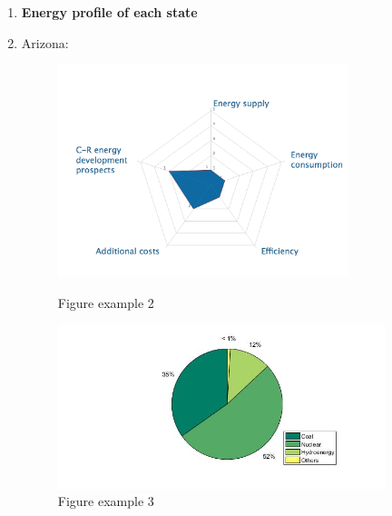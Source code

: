 \documentclass{mcmthesis}
\begin{document}
        \begin{enumerate}
          \item \textbf{Energy profile of each state}

          \item Arizona:
          
          
          
          \begin{figure}[h]
          \begin{minipage}[h]{0.6\linewidth}
          \centering
          \includegraphics[width=0.8\textwidth]{AZ.png}
          \caption{Figure example 2}
          \end{minipage}
          \begin{minipage}[h]{0.6\linewidth}
          \centering
          \includegraphics[width=0.9\textwidth]{AZ1.jpg}
          \caption{Figure example 3}
          \end{minipage}
          \end{figure}
          
          
          
          
          
          
          

\end{enumerate}
\end{document}
